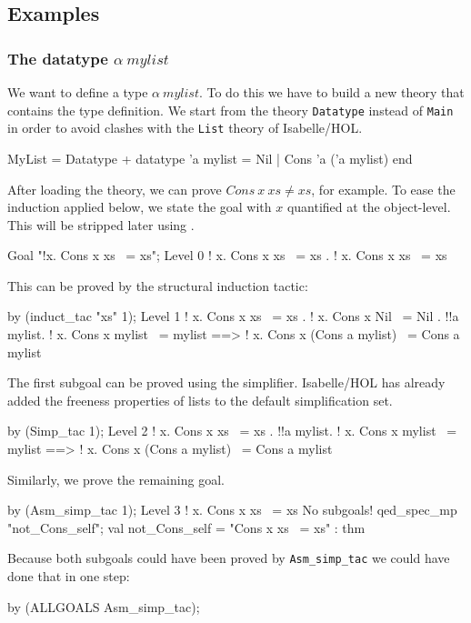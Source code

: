 \subsection{Examples}

\subsubsection{The datatype $\alpha~mylist$}

We want to define a type $\alpha~mylist$. To do this we have to build a new
theory that contains the type definition.  We start from the theory
\texttt{Datatype} instead of \texttt{Main} in order to avoid clashes with the
\texttt{List} theory of Isabelle/HOL.
\begin{ttbox}
MyList = Datatype +
  datatype 'a mylist = Nil | Cons 'a ('a mylist)
end
\end{ttbox}
After loading the theory, we can prove $Cons~x~xs\neq xs$, for example.  To
ease the induction applied below, we state the goal with $x$ quantified at the
object-level.  This will be stripped later using .
\begin{ttbox}
Goal "!x. Cons x xs ~= xs";
{\out Level 0}
{\out ! x. Cons x xs ~= xs}
{. ! x. Cons x xs ~= xs}
\end{ttbox}
This can be proved by the structural induction tactic:
\begin{ttbox}
by (induct_tac "xs" 1);
{\out Level 1}
{\out ! x. Cons x xs ~= xs}
{. ! x. Cons x Nil ~= Nil}
{. !!a mylist.}
{\out        ! x. Cons x mylist ~= mylist ==>}
{\out        ! x. Cons x (Cons a mylist) ~= Cons a mylist}
\end{ttbox}
The first subgoal can be proved using the simplifier.  Isabelle/HOL has
already added the freeness properties of lists to the default simplification
set.
\begin{ttbox}
by (Simp_tac 1);
{\out Level 2}
{\out ! x. Cons x xs ~= xs}
{. !!a mylist.}
{\out        ! x. Cons x mylist ~= mylist ==>}
{\out        ! x. Cons x (Cons a mylist) ~= Cons a mylist}
\end{ttbox}
Similarly, we prove the remaining goal.
\begin{ttbox}
by (Asm_simp_tac 1);
{\out Level 3}
{\out ! x. Cons x xs ~= xs}
{\out No subgoals!}
\ttbreak
qed_spec_mp "not_Cons_self";
{\out val not_Cons_self = "Cons x xs ~= xs" : thm}
\end{ttbox}
Because both subgoals could have been proved by \texttt{Asm_simp_tac}
we could have done that in one step:
\begin{ttbox}
by (ALLGOALS Asm_simp_tac);
\end{ttbox}


